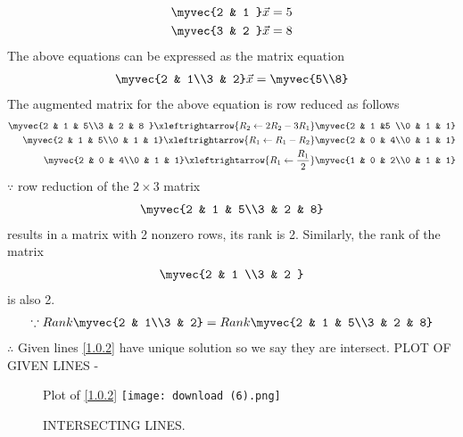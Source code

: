 \documentclass[journal,12pt,twocolumn]{IEEEtran}
\begin{document}
\begin{enumerate}
\begin{align}
\begin{split}
\myvec{2 & 1 }\vec{x}&=5  
\\
\myvec{3 & 2 }\vec{x}&=8
\end{split}
\end{align}
The above equations can be expressed as the matrix equation
\begin{align}
\myvec{2 & 1\\3 & 2}
\vec{x} = \myvec{5\\8}
\end{align}
%
The augmented matrix for the above equation is row reduced as follows
\begin{align}
\myvec{2 & 1 & 5\\3 & 2 & 8 }
\xleftrightarrow {R_2\leftarrow 2R_2-3R_1}\myvec{2 & 1 &5 \\0 & 1 & 1}
\\
\myvec{2 & 1 & 5\\0 & 1 & 1}
\xleftrightarrow {R_1\leftarrow
R_1-R_2}\myvec{2 & 0 & 4\\0 & 1 & 1}
\\
\myvec{2 & 0 & 4\\0 & 1 & 1}
\xleftrightarrow{R_1\leftarrow \frac{R_1}{2}}\myvec{1 & 0 & 2\\0 & 1 & 1}
\end{align}
%
$\because$ row reduction of the $2\times 3$ matrix
%
\begin{align}
\myvec{2 & 1 & 5\\3 & 2 & 8}
\end{align}
%
results in a matrix with 2 nonzero rows, its rank is 2. 
%
Similarly, the rank of the matrix 
\begin{align}
\myvec{2 & 1 \\3 & 2 } 
\end{align}
%
is also 2.
%
\begin{align}
\because Rank \myvec{2 & 1\\3 & 2} &= Rank\myvec{2 & 1 & 5\\3 & 2 & 8}\nonumber\\
\end{align}
$\therefore$ Given lines \eqref{1.0.2} have unique  solution so we say they are intersect.  
PLOT OF GIVEN LINES -
\begin{figure}[ht]
Plot of \eqref{1.0.2} 
    \centering
   \texttt{[image: download (6).png]}
    \caption{INTERSECTING LINES.}
    \label{fig: INTERSECTING LINES.}
\end{figure}    
\end{enumerate}
\end{document}
